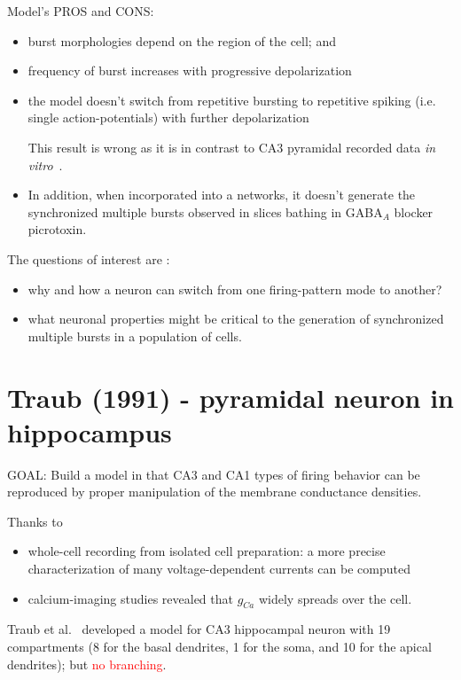 Model's PROS and CONS:
\begin{itemize}

  \item burst morphologies depend on the region of the cell; and 
  
  \item frequency of burst increases with progressive depolarization
  
  \item the model doesn't switch from repetitive bursting to repetitive spiking
  (i.e. single action-potentials) with further depolarization
  
This result is wrong as it is in contrast to CA3 pyramidal recorded data {\it in
vitro}~\citep{wong1981agh}.

  \item In addition, when incorporated into a networks, it doesn't generate the
  synchronized multiple bursts observed in slices bathing in GABA$_A$ blocker
  picrotoxin.

\end{itemize}

The questions of interest are :
\begin{itemize}
\item why and how a neuron can switch from one firing-pattern mode to
  another?
\item what neuronal properties might be critical to the generation of
  synchronized multiple bursts in a population of cells.
\end{itemize}

\section{Traub (1991) - pyramidal neuron in hippocampus}
\label{sec:Traub-1991}

GOAL: Build a model in that CA3 and CA1 types of firing behavior can be
reproduced by proper manipulation of the membrane conductance densities.

Thanks to
\begin{itemize}
\item whole-cell recording from isolated cell preparation: a more
  precise characterization of many voltage-dependent currents can be
  computed
\item calcium-imaging studies revealed that $g_{Ca}$ widely spreads
  over the cell. 
\end{itemize}

Traub et al.~\citep{traub1991ca3} developed a model for CA3 hippocampal neuron
with 19 compartments (8 for the basal dendrites, 1 for the soma, and 10 for the
apical dendrites); but \textcolor{red}{no branching}. 

